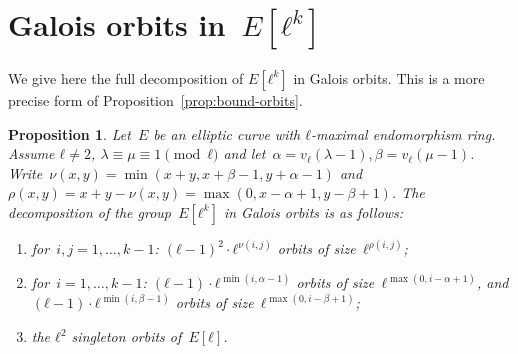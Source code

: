 \documentclass{lms}
\newcommand{\todo}[1]{{\color{red}TODO: #1}}
\newtheorem{prop}[thm]{Proposition}
\begin{document}
\goodbreak
\section{Galois orbits in~$E[ℓ^k]$}
\label{ap:galois}

We give here the full decomposition of $E[ℓ^k]$ in Galois orbits.
This is a more precise form of Proposition~\ref{prop:bound-orbits}.
\begin{prop}\label{prop:orbites-l-torsion}
Let~$E$ be an elliptic curve with $ℓ$-maximal endomorphism ring.
Assume $ℓ ≠ 2$, $λ ≡ μ ≡ 1 \pmod{ℓ}$ and let~$α = v_ℓ(λ-1), β=v_ℓ(μ-1)$.
Write~$ν(x, y) = \min (x+y, x+β-1, y+α-1)$
and~$ρ(x, y) = x+y - ν(x, y) = \max (0, x-α+1, y-β+1)$.
The decomposition of the group~$E[ℓ^k]$ in Galois orbits is as follows:
\begin{enumerate}
\item for~$i, j = 1, …, k-1$:
$(ℓ-1)^2 · ℓ^{ν(i,j)}$ orbits of size~$ℓ^{ρ(i,j)}$;
\item for~$i = 1, …, k-1$:
$(ℓ-1) · ℓ^{\min (i, α-1)}$ orbits of size~$ℓ^{\max (0, i-α+1)}$, and
$(ℓ-1) · ℓ^{\min (i, β-1)}$ orbits of size~$ℓ^{\max (0, i-β+1)}$;
\item the $ℓ^2$ singleton orbits of~$E[ℓ]$.
\end{enumerate}
\end{prop}
\end{document}

